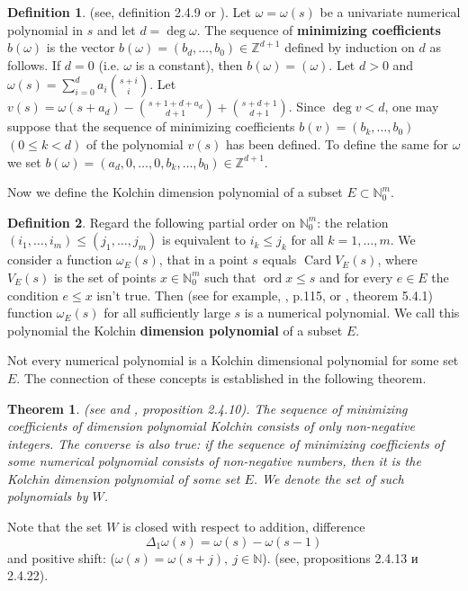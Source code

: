 \documentclass[a4paper,reqno,12pt]{amsart}
\theoremstyle{plain}
\newtheorem{theorem}{Theorem}
\theoremstyle{remark}
\theoremstyle{definition}
\newtheorem{definition}{Definition}
\renewcommand{\le}{\leqslant}
\DeclareMathOperator {\ord}{ord}
\DeclareMathOperator {\Card}{Card}
\newcommand{\N}{\mathbb{N}}
\newcommand{\Z}{\mathbb{Z}}
\def\deg{\operatorname{deg}}
\def\ord{\operatorname{ord}}
\begin{document}
\begin{definition}\label{min}(see\cite{KLMP}, definition 2.4.9 or \cite{Kondr}).
Let $\omega=\omega(s)$ be a univariate numerical polynomial in $s$ and let
$d=\deg\omega$. The sequence of {\bf minimizing coefficients}  
$b(\omega)$ 
is the vector $b(\omega)=(b_d,\dots ,b_0)\in\Z^{d+1}$ defined by 
induction on
$d$ as follows. If $d=0$ (i.e. $\omega$ is a constant), then
$b(\omega)=(\omega)$. Let $d>0$ and $\omega(s)=\sum^d_{i=0}a_i\binom{s+i}{i}$.
Let $v(s) = \omega(s+a_d) - \binom{s+1+d+a_d}{d+1} + \binom{s+d+1}{d+1}$. Since
$\deg v<d$, one may suppose that the sequence of minimizing coefficients
$b(v)=(b_k,\dots ,b_0)$ $(0\leq k<d)$ of the polynomial $v(s)$ has been 
defined. To define the same for $\omega$ we set $b(\omega)=(a_d,0,\dots
,0,b_k,\dots ,b_0)\in\Z^{d+1}$.
\end{definition}

Now  we define the Kolchin dimension polynomial
of a subset $E\subset \N_0^m$.
\begin{definition}\label{Kolchin}
Regard the following partial order on $\N_0^m$: the relation
$(i_1,\dots, i_m)\le(j_1,\dots, j_m)$ is equivalent to
$i_k\le j_k$ for all $k=1,\dots, m$.
We  consider a function $\omega_E(s)$, that   in a point $s$ 
equals $\Card V_E(s)$, where $V_E(s)$ is the set
of points $x\in\N_0^m$ such that $\ord x\le s$ 
and for every $e\in E$ the condition $e\le x$ isn't true.
Then (see for example, \cite{Kolchin}, p.115, or \cite{KLMP}, 
theorem 5.4.1) function $\omega_E(s)$ for all sufficiently large 
$s$ is a numerical polynomial. We call this polynomial
the Kolchin {\bf dimension polynomial} of a subset $E$.
\end{definition}

Not every numerical polynomial is a Kolchin dimensional polynomial for 
some set $E$.
The connection of these concepts is established in the following theorem.

\begin{theorem}\label{w}
(see \cite{Kondr} and \cite{KLMP}, proposition 2.4.10). 
The sequence of
 minimizing  coefficients
of
dimension polynomial Kolchin consists of only non-negative integers.
The converse is also true: if the sequence of minimizing coefficients 
of some numerical  polynomial consists of non-negative numbers, 
then it is the Kolchin dimension polynomial of some set $ E $.
We denote the set of such polynomials by $W$.
\end{theorem}

Note that the set $W$ is closed with respect to addition,
difference
\begin{equation}\label{delta}
\Delta_1\omega(s)=\omega(s)-\omega(s-1)
\end{equation}
and  positive shift: ($\omega(s)=\omega(s+j), \ j\in\N$).
 (see\cite{KLMP}, propositions 2.4.13 и 2.4.22).
\end{document}
